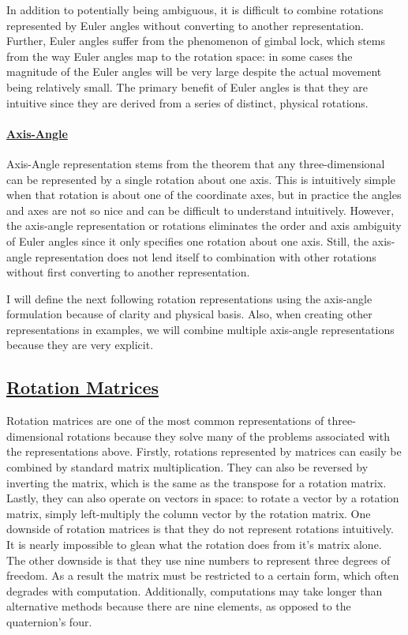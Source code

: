 \documentclass[letterpaper,10pt]{article}
\begin{document}
In addition to potentially being ambiguous, it is difficult to combine rotations represented by Euler angles without converting to another representation. Further, Euler angles suffer from the phenomenon of gimbal lock, which stems from the way Euler angles map to the rotation space: in some cases the magnitude of the Euler angles will be very large despite the actual movement being relatively small. The primary benefit of Euler angles is that they are intuitive since they are derived from a series of distinct, physical rotations.

\paragraph{\href{http://en.wikipedia.org/wiki/Axis?angle_representation}{Axis-Angle}}
Axis-Angle representation stems from the theorem that any three-dimensional can be represented by a single rotation about one axis. This is intuitively simple when that rotation is about one of the coordinate axes, but in practice the angles and axes are not so nice and can be difficult to understand intuitively. However, the axis-angle representation or rotations eliminates the order and axis ambiguity of Euler angles since it only specifies one rotation about one axis. Still, the axis-angle representation does not lend itself to combination with other rotations without first converting to another representation.

I will define the next following rotation representations using the axis-angle formulation because of clarity and physical basis. Also, when creating other representations in examples, we will combine multiple axis-angle representations because they are very explicit.

\subsection{\href{http://en.wikipedia.org/wiki/Rotation_matrix}{Rotation Matrices}}
Rotation matrices are one of the most common representations of three-dimensional rotations because they solve many of the problems associated with the representations above. Firstly, rotations represented by matrices can easily be combined by standard matrix multiplication. They can also be reversed by inverting the matrix, which is the same as the transpose for a rotation matrix. Lastly, they can also operate on vectors in space: to rotate a vector by a rotation matrix, simply left-multiply the column vector by the rotation matrix. One downside of rotation matrices is that they do not represent rotations intuitively. It is nearly impossible to glean what the rotation does from it's matrix alone. The other downside is that they use nine numbers to represent three degrees of freedom. As a result the matrix must be restricted to a certain form, which often degrades with computation. Additionally, computations may take longer than alternative methods because there are nine elements, as opposed to the quaternion's four.
\end{document}
